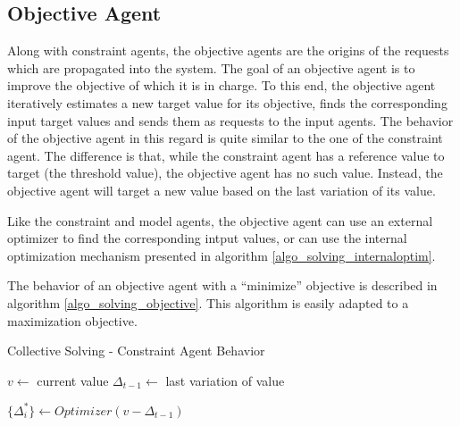 \subsection{Objective Agent}

Along with constraint agents, the objective agents are the origins of the requests which are propagated into the system. The goal of an objective agent is to improve the objective of which it is in charge. To this end, the objective agent iteratively estimates a new target value for its objective, finds the corresponding input target values and sends them as requests to the input agents. The behavior of the objective agent in this regard is quite similar to the one of the constraint agent. The difference is that, while the constraint agent has a reference value to target (the threshold value), the objective agent has no such value. Instead, the objective agent will target a new value based on the last variation of its value.

Like the constraint and model agents, the objective agent can use an external optimizer to find the corresponding intput values, or can use the internal optimization mechanism presented in algorithm \ref{algo_solving_internaloptim}.

The behavior of an objective agent with a \enquote{minimize} objective is described in algorithm \ref{algo_solving_objective}. This algorithm is easily adapted to a maximization objective.

\begin{algorithm}
\caption{Collective Solving - Constraint Agent Behavior}
\label{algo_solving_objective}

$v \leftarrow $ current value\;
$\Delta_{t-1} \leftarrow $ last variation of value \;

\BlankLine
$\{ \Delta^*_i \} \leftarrow Optimizer(v - \Delta_{t-1})$\;
	
\end{algorithm}

